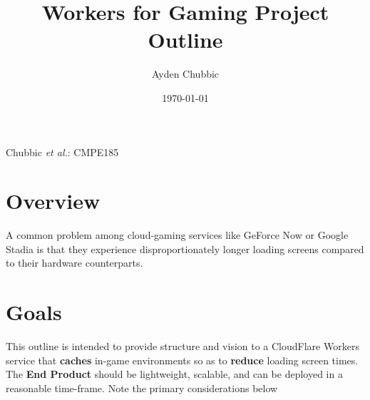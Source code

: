 \documentclass[12pt,journal,compsoc]{IEEEtran}
\begin{document}
\titleformat{\subsection}[runin]
  {\normalfont\large\bfseries}{\thesubsection}{1em}{}
\titleformat{\subsubsection}[runin]
  {\normalfont\normalsize\bfseries}{\thesubsubsection}{1em}{}


\title{Workers for Gaming Project Outline}
\author{Ayden Chubbic}

\date{\today}		

%
{Chubbic \MakeLowercase{\textit{et al.}}: CMPE185}


\maketitle

\section{Overview}A common problem among cloud-gaming  services like GeForce Now or Google Stadia is that they experience disproportionately longer loading screens compared to their hardware counterparts.

\section{Goals} This outline is intended to provide structure and vision to a CloudFlare Workers service that \textbf{caches} in-game environments so as to \textbf{reduce} loading screen times. The \textbf{End Product} should be lightweight, scalable, and can be deployed in a reasonable time-frame. Note the primary considerations below
\end{document}
